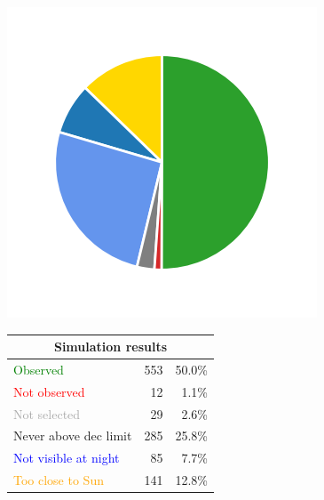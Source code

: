 \begin{colsection}
\begin{figure}[p]
    \begin{center}
        \begin{minipage}[t]{0.15\linewidth}\vspace{0.6cm}
            \includegraphics[trim={.5cm 0 .5cm 0},clip,width=\linewidth]{images/gw_sims/1n8_pie.png}
        \end{minipage}
        \begin{minipage}[t]{0.45\linewidth}\vspace{0pt}
            \begin{tabular}{lrr}
                \multicolumn{3}{c}{\textbf{Simulation results}} \\
                \midrule
                \textcolor{Green}{Observed} & 553 & 50.0\% \\
                \textcolor{Red}{Not observed} & 12 & 1.1\% \\
                \textcolor{darkgray}{Not selected} & 29 & 2.6\% \\
                \textcolor{NavyBlue}{Never above dec limit} & 285 & 25.8\% \\
                \textcolor{Blue}{Not visible at night} & 85 & 7.7\% \\
                \textcolor{Orange}{Too close to Sun} & 141 & 12.8\% \\

\end{tabular}
\end{minipage}
\end{center}
\end{figure}
\end{colsection}

